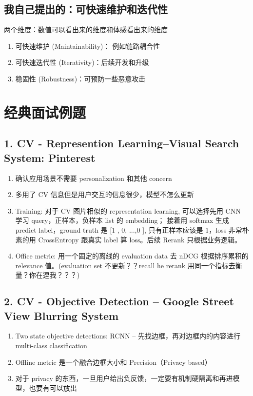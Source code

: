 \documentclass[12pt]{article}
\numberwithin{theorem}{section} %
\numberwithin{definition}{section} %
\numberwithin{assumption}{section} %
\numberwithin{lemma}{section} %
\numberwithin{remark}{section} %
\numberwithin{prop}{section} %
\numberwithin{corollary}{section} %
\numberwithin{example}{section} %
\numberwithin{question}{section} %
\numberwithin{problem}{section} %
\numberwithin{conjecture}{section} %
\numberwithin{append}{section} %
\numberwithin{property}{section} %
\begin{document}
\begin{CJK}{UTF8}{gbsn}
	\subsection{我自己提出的：可快速维护和迭代性}
	
	两个维度：数值可以看出来的维度和体感看出来的维度
	\begin{enumerate}
		\item 可快速维护 (Maintainability)： 例如链路耦合性
		\item 可快速迭代性 (Iterativity)：后续开发和升级
		\item 稳固性 (Robustness)：可预防一些恶意攻击
	\end{enumerate}
	
	\section{经典面试例题}
	\subsection{1. CV - Represention Learning--Visual Search System: Pinterest}
	\begin{enumerate}
		\item 确认应用场景不需要 personalization 和其他 concern
		\item 多用了 CV 信息但是用户交互的信息很少，模型不怎么更新
		\item Training: 对于 CV 图片相似的 representation learning, 可以选择先用 CNN 学习 query，正样本，负样本 list 的 embedding； 接着用 softmax 生成 predict label，ground truth 是 [1 , 0, ...,0 ], 只有正样本应该是 1，loss 非常朴素的用 CrossEntropy 跟真实 label 算 loss。后续 Rerank 只根据业务逻辑。
		\item Office metric: 用一个固定的离线的 evaluation data 去 nDCG 根据排序累积的 relevance 值。(evaluation set 不更新？？recall he rerank 用同一个指标去衡量？你在逗我？？？)
	\end{enumerate}
	\subsection{2. CV - Objective Detection -- Google Street View Blurring System}
	\begin{enumerate}
		\item Two state objective detections: RCNN -- 先找边框，再对边框内的内容进行 multi-class classification
		\item Offline metric 是一个融合边框大小和 Precision（Privacy based）
		\item 对于 privacy 的东西，一旦用户给出负反馈，一定要有机制硬隔离和再进模型，也要有可以放出
	\end{enumerate}

\end{CJK}
\end{document}
